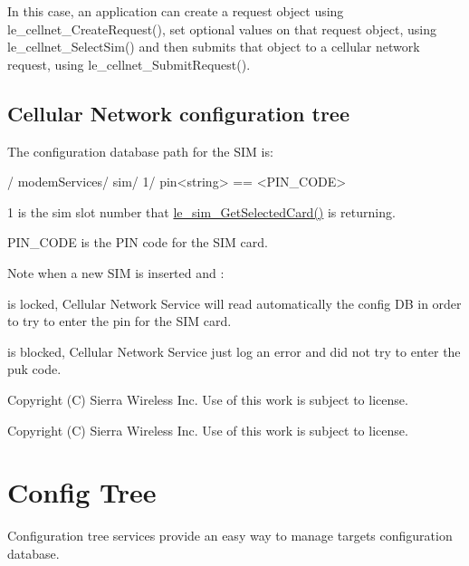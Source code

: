 In this case, an application can create a request object using le\+\_\+cellnet\+\_\+\+Create\+Request(), set optional values on that request object, using le\+\_\+cellnet\+\_\+\+Select\+Sim() and then submits that object to a cellular network request, using le\+\_\+cellnet\+\_\+\+Submit\+Request().\hypertarget{c_le_cellnet_c_le_cellnet_configdb}{}\subsection{Cellular Network configuration tree}\label{c_le_cellnet_c_le_cellnet_configdb}
The configuration database path for the S\+I\+M is\+: \begin{DoxyVerb} /
     modemServices/
         sim/
             1/
                 pin<string> == <PIN_CODE>\end{DoxyVerb}



\begin{DoxyItemize}
\item \textquotesingle{}1\textquotesingle{} is the sim slot number that \hyperlink{le__sim__interface_8h_a4c9e3ded0485f14c66e4d51763f2de57}{le\+\_\+sim\+\_\+\+Get\+Selected\+Card()} is returning.
\item \textquotesingle{}P\+I\+N\+\_\+\+C\+O\+D\+E\textquotesingle{} is the P\+I\+N code for the S\+I\+M card.
\end{DoxyItemize}

\begin{DoxyNote}{Note}
when a new S\+I\+M is inserted and \+:
\begin{DoxyItemize}
\item is locked, Cellular Network Service will read automatically the config D\+B in order to try to enter the pin for the S\+I\+M card.
\item is blocked, Cellular Network Service just log an error and did not try to enter the puk code.
\end{DoxyItemize}
\end{DoxyNote}
Copyright (C) Sierra Wireless Inc. Use of this work is subject to license.





Copyright (C) Sierra Wireless Inc. Use of this work is subject to license. \hypertarget{legatoServicesConfigTree}{}\section{Config Tree}\label{legatoServicesConfigTree}
Configuration tree services provide an easy way to manage target\textquotesingle{}s configuration database.

